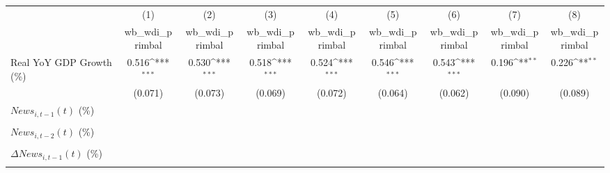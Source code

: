 {
\def\sym#1{\ifmmode^{#1}\else\(^{#1}\)\fi}
\begin{tabular}{l*{8}{c}}
\toprule
                    &\multicolumn{1}{c}{(1)}&\multicolumn{1}{c}{(2)}&\multicolumn{1}{c}{(3)}&\multicolumn{1}{c}{(4)}&\multicolumn{1}{c}{(5)}&\multicolumn{1}{c}{(6)}&\multicolumn{1}{c}{(7)}&\multicolumn{1}{c}{(8)}\\
                    &\multicolumn{1}{c}{wb_wdi_primbal}&\multicolumn{1}{c}{wb_wdi_primbal}&\multicolumn{1}{c}{wb_wdi_primbal}&\multicolumn{1}{c}{wb_wdi_primbal}&\multicolumn{1}{c}{wb_wdi_primbal}&\multicolumn{1}{c}{wb_wdi_primbal}&\multicolumn{1}{c}{wb_wdi_primbal}&\multicolumn{1}{c}{wb_wdi_primbal}\\
\midrule
Real YoY GDP Growth (\%)&       0.516\sym{***}&       0.530\sym{***}&       0.518\sym{***}&       0.524\sym{***}&       0.546\sym{***}&       0.543\sym{***}&       0.196\sym{**} &       0.226\sym{**} \\
                    &     (0.071)         &     (0.073)         &     (0.069)         &     (0.072)         &     (0.064)         &     (0.062)         &     (0.090)         &     (0.089)         \\
\addlinespace
$ News_{i,t-1}(t)$ (\%)&                     &                     &                     &                     &                     &                     &                     &                     \\
                    &                     &                     &                     &                     &                     &                     &                     &                     \\
\addlinespace
$ News_{i,t-2}(t)$ (\%)&                     &                     &                     &                     &                     &                     &                     &                     \\
                    &                     &                     &                     &                     &                     &                     &                     &                     \\
\addlinespace
$ \Delta News_{i,t-1}(t)$ (\%)&                     &                     &                     &                     &                     &                     &                     &                     \\
                    &                     &                     &                     &                     &                     &                     &                     &                     \\

\end{tabular}}
